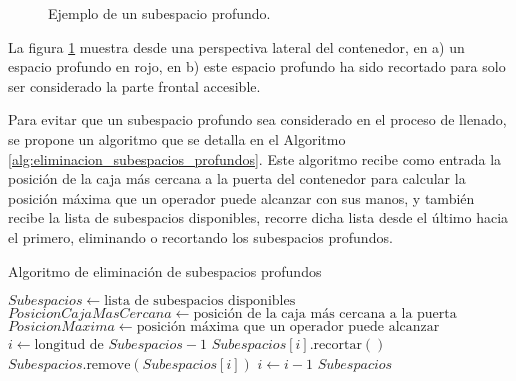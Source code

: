 \begin{figure}[H]
    \centering
    
    \caption{Ejemplo de un subespacio profundo.}
    \label{fig:subespacio_profundo}
\end{figure}

La figura \ref{fig:subespacio_profundo} muestra desde una perspectiva lateral del contenedor, en a) un espacio profundo en rojo, en b) este espacio profundo ha sido recortado para solo ser considerado la parte frontal accesible.

Para evitar que un subespacio profundo sea considerado en el proceso de llenado, se propone un algoritmo que se detalla en el Algoritmo \ref{alg:eliminacion_subespacios_profundos}. Este algoritmo recibe como entrada la posición de la caja más cercana a la puerta del contenedor para calcular la posición máxima que un operador puede alcanzar con sus manos, y también recibe la lista de subespacios disponibles, recorre dicha lista desde el último hacia el primero, eliminando o recortando los subespacios profundos.

\begin{algorithm}[H]
    \caption{Algoritmo de eliminación de subespacios profundos}
    \label{alg:eliminacion_subespacios_profundos}
    \begin{algorithmic}[1]
        \State $Subespacios \gets \text{lista de subespacios disponibles}$
        \State $PosicionCajaMasCercana \gets \text{posición de la caja más cercana a la puerta}$
        \State $PosicionMaxima \gets \text{posición máxima que un operador puede alcanzar}$
        \State $i \gets \text{longitud de } Subespacios - 1$
        \State $Subespacios[i].\text{recortar}()$
        \State $Subespacios.\text{remove}(Subespacios[i])$
        \EndIf
        \State $i \gets i - 1$
        \EndWhile
        \State \Return $Subespacios$
    \end{algorithmic}
\end{algorithm}

